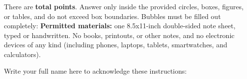  There are {\bf {} total points}.
Answer only inside the provided circles, boxes, figures, or tables, and do not
exceed box boundaries. Bubbles must be filled out completely:
 
{\bf Permitted materials:} one 8.5x11-inch double-sided note sheet, typed or
handwritten. No books, printouts, or other notes, and no electronic devices of
any kind (including phones, laptops, tablets, smartwatches, and calculators).

\vspace{0.3em}
\noindent Write your full name here to acknowledge these instructions: 

